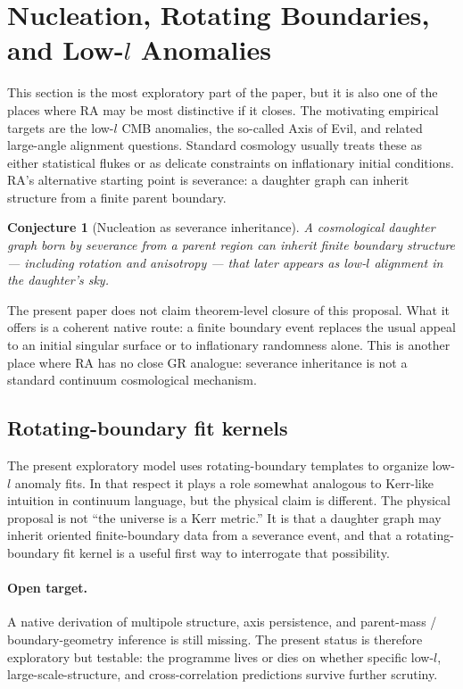 \documentclass[11pt]{article}
\def\ell{l}%
\newtheorem{conjecture}{Conjecture}
\begin{document}
\section{Nucleation, Rotating Boundaries, and Low-\texorpdfstring{$\ell$}{l} Anomalies}
\label{sec:nucleation}

This section is the most exploratory part of the paper, but it is also one of the places where RA may be most distinctive if it closes. The motivating empirical targets are the low-$\ell$ CMB anomalies, the so-called Axis of Evil, and related large-angle alignment questions. Standard cosmology usually treats these as either statistical flukes or as delicate constraints on inflationary initial conditions. RA's alternative starting point is severance: a daughter graph can inherit structure from a finite parent boundary.

\begin{conjecture}[Nucleation as severance inheritance]
A cosmological daughter graph born by severance from a parent region can inherit finite boundary structure --- including rotation and anisotropy --- that later appears as low-$\ell$ alignment in the daughter's sky.
\end{conjecture}

The present paper does not claim theorem-level closure of this proposal. What it offers is a coherent native route: a finite boundary event replaces the usual appeal to an initial singular surface or to inflationary randomness alone. This is another place where RA has no close GR analogue: severance inheritance is not a standard continuum cosmological mechanism.

\subsection{Rotating-boundary fit kernels}

The present exploratory model uses rotating-boundary templates to organize low-$\ell$ anomaly fits. In that respect it plays a role somewhat analogous to Kerr-like intuition in continuum language, but the physical claim is different. The physical proposal is not ``the universe is a Kerr metric.'' It is that a daughter graph may inherit oriented finite-boundary data from a severance event, and that a rotating-boundary fit kernel is a useful first way to interrogate that possibility.

\paragraph{Open target.} A native derivation of multipole structure, axis persistence, and parent-mass / boundary-geometry inference is still missing. The present status is therefore exploratory but testable: the programme lives or dies on whether specific low-$\ell$, large-scale-structure, and cross-correlation predictions survive further scrutiny.
\end{document}
